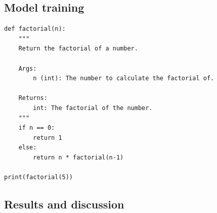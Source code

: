 \documentclass[a4paper]{article}
\begin{document}
\subsection{Model training}


\begin{lstlisting}
def factorial(n):
    """
    Return the factorial of a number.
    
    Args:
        n (int): The number to calculate the factorial of.
    
    Returns:
        int: The factorial of the number.
    """
    if n == 0:
        return 1
    else:
        return n * factorial(n-1)

print(factorial(5))
\end{lstlisting}
\subsection{Results and discussion}




\end{document}
